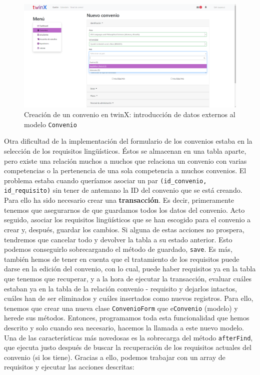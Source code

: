 \begin{figure}
	\centering
	\includegraphics[width=\linewidth]{Capturas de twinX/creacion_convenio_3}
	\caption[Creación de un convenio en twinX 3]{Creación de un convenio en twinX: introducción de datos externos al modelo \texttt{Convenio}}
	\label{fig:creacionconvenio3}
\end{figure}

Otra dificultad de la implementación del formulario de los convenios estaba en la selección de los requisitos lingüísticos. Éstos se almacenan en una tabla aparte, pero existe una relación muchos a muchos que relaciona un convenio con varias competencias o la pertenencia de una sola competencia a muchos convenios. El problema estaba cuando queríamos asociar un par \texttt{(id\_convenio, id\_requisito)} sin tener de antemano la ID del convenio que se está creando. Para ello ha sido necesario crear una \textbf{transacción}. Es decir, primeramente tenemos que asegurarnos de que guardamos todos los datos del convenio. Acto seguido, asociar los requisitos lingüísticos que se han escogido para el convenio a crear y, después, guardar los cambios. Si alguna de estas acciones no prospera, tendremos que cancelar todo y devolver la tabla a su estado anterior. Esto podemos conseguirlo sobrecargando el método de guardado, \texttt{save}.
Es más, también hemos de tener en cuenta que el tratamiento de los requisitos puede darse en la edición del convenio, con lo cual, puede haber requisitos ya en la tabla que tenemos que recuperar, y a la hora de ejecutar la transacción, evaluar cuáles estaban ya en la tabla de la relación convenio - requisito y dejarlos intactos, cuáles han de ser eliminados y cuáles insertados como nuevos registros.
Para ello, tenemos que crear una nueva clase \texttt{ConvenioForm} que e\texttt{Convenio} (modelo) y herede sus métodos. Entonces, programamos toda esta funcionalidad que hemos descrito y solo cuando sea necesario, hacemos la llamada a este nuevo modelo. Una de las características más novedosas es la sobrecarga del método \texttt{afterFind}, que ejecuta justo después de buscar la recuperación de los requisitos actuales del convenio (si los tiene). Gracias a ello, podemos trabajar con un array de requisitos y ejecutar las acciones descritas:

